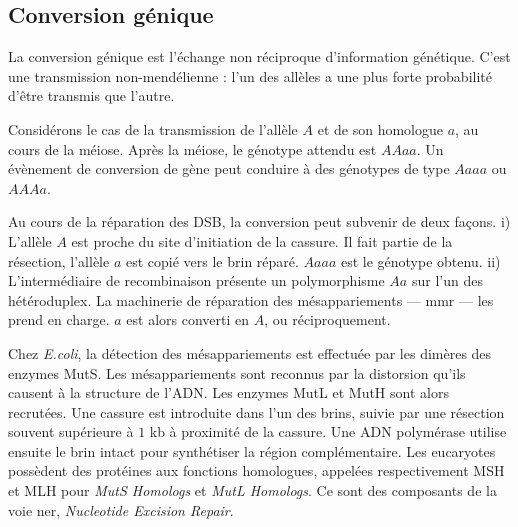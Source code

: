 \documentclass[11pt, oneside]{scrartcl}
\begin{document}

\subsection{Conversion génique}
\label{sec:orgheadline6}
La conversion génique est l'échange non réciproque d'information génétique.
C'est une transmission non-mendélienne : l'un des allèles a une plus forte
probabilité d'être transmis que l'autre\cite{chen_gene_2007}. 

Considérons le cas de la transmission de l'allèle \(A\) et de son homologue \(a\),
au cours de la méiose. Après la méiose, le génotype attendu est \(AAaa\). Un
évènement de conversion de gène peut conduire à des génotypes de type \(Aaaa\) ou
\(AAAa\).

Au cours de la réparation des DSB, la conversion peut subvenir de deux façons.
i) L'allèle \(A\) est proche du site d'initiation de la cassure. Il fait partie de
la résection, l'allèle \(a\) est copié vers le brin réparé. \(Aaaa\) est le génotype
obtenu. ii) L'intermédiaire de recombinaison présente un polymorphisme \(Aa\) sur
l'un des hétéroduplex. La machinerie de réparation des mésappariements ---
\ac{mmr} --- les prend en charge. \(a\) est alors converti en \(A\), ou
réciproquement.

Chez \emph{E.coli}, la détection des mésappariements est effectuée par les dimères
des enzymes MutS. Les mésappariements sont reconnus par la distorsion qu'ils
causent à la structure de l'ADN. Les enzymes MutL et MutH sont alors recrutées.
Une cassure est introduite dans l'un des brins, suivie par une résection souvent
supérieure à \(1\) kb à proximité de la cassure. Une ADN polymérase utilise
ensuite le brin intact pour synthétiser la région complémentaire. Les eucaryotes
possèdent des protéines aux fonctions homologues, appelées respectivement MSH et
MLH pour \emph{MutS Homologs} et \emph{MutL Homologs}. Ce sont des composants de la voie
\ac{ner}, \emph{Nucleotide Excision Repair}.
\end{document}

